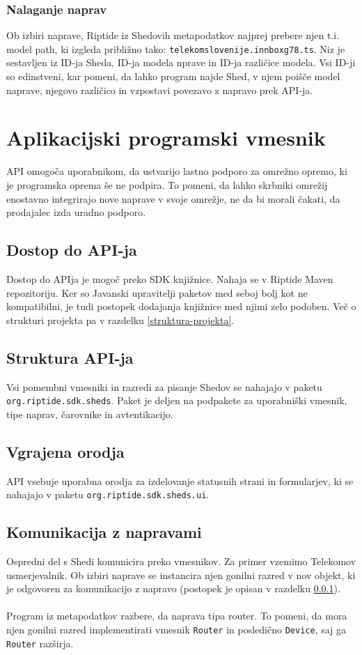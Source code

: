 \documentclass[12pt]{article}
\begin{document}
\subsubsection{Nalaganje naprav} \label{nalaganje-naprav}
Ob izbiri naprave, Riptide iz Shedovih metapodatkov najprej prebere
njen t.i. model path, ki izgleda približno
tako: \texttt{telekomslovenije.innboxg78.ts}. Niz je sestavljen iz ID-ja
Sheda, ID-ja modela nprave in ID-ja različice modela. Vsi ID-ji so
edinstveni, kar pomeni, da lahko program najde Shed, v njem poišče model
naprave, njegovo različico in vzpostavi povezavo z napravo prek API-ja.
\newpage

\section{Aplikacijski programski vmesnik}
API omogoča uporabnikom, da ustvarijo lastno podporo za omrežno
opremo, ki je programska oprema še ne podpira. To pomeni, da lahko
skrbniki omrežij enostavno integrirajo nove naprave v svoje omrežje, ne da
bi morali čakati, da prodajalec izda uradno podporo.

\subsection{Dostop do API-ja}
Dostop do APIja je mogoč preko SDK knjižnice. Nahaja se v Riptide
Maven repozitoriju. Ker so Javanski upravitelji paketov med seboj bolj
kot ne kompatibilni, je tudi postopek dodajanja knjižnice med njimi
zelo podoben. Več o strukturi projekta pa v razdelku
\ref{struktura-projekta}.

\subsection{Struktura API-ja}
Vsi pomembni vmesniki in razredi za pisanje Shedov se nahajajo v
paketu \texttt{org\-.riptide.sdk.sheds}. Paket je deljen na podpakete za
uporabniški vmesnik, tipe naprav, čarovnike in avtentikacijo.

\subsection{Vgrajena orodja}
API vsebuje uporabna orodja za izdelovanje statusnih strani in
formularjev, ki se nahajajo v paketu \texttt{org.riptide.sdk.sheds.ui}.

\subsection{Komunikacija z napravami} \label{komunikacija-z-napravami}
Ospredni del s Shedi komunicira preko vmesnikov. Za primer vzemimo
Telekomov usmerjevalnik. Ob izbiri naprave se instancira njen gonilni
razred v nov objekt, ki je odgovoren za komunikacijo z napravo
(postopek je opisan v razdelku \ref{nalaganje-naprav}).
\\\\
Program iz metapodatkov razbere, da naprava tipa router. To pomeni,
da mora njen gonilni razred implementirati vmesnik \texttt{Router} in
posledično \texttt{Device}, saj ga \texttt{Router} razširja.
\newpage
\end{document}
